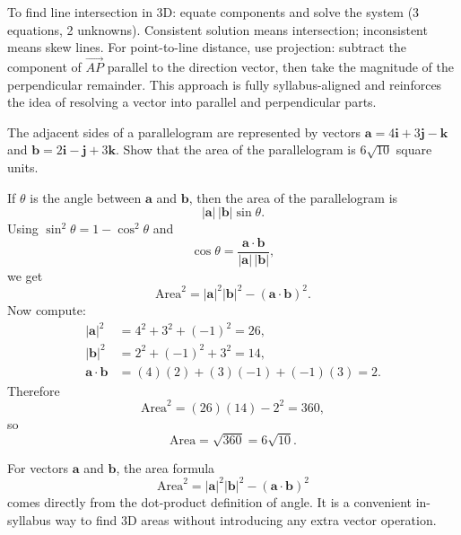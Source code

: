 \begin{takeaways}
To find line intersection in 3D: equate components and solve the system (3 equations, 2 unknowns). Consistent solution means intersection; inconsistent means skew lines. For point-to-line distance, use projection: subtract the component of $\vec{AP}$ parallel to the direction vector, then take the magnitude of the perpendicular remainder. This approach is fully syllabus-aligned and reinforces the idea of resolving a vector into parallel and perpendicular parts.
\end{takeaways}

\vspace{1em}

\begin{problem}
The adjacent sides of a parallelogram are represented by vectors 
$\mathbf{a} = 4\mathbf{i} + 3\mathbf{j} - \mathbf{k}$ and $\mathbf{b} = 2\mathbf{i} - \mathbf{j} + 3\mathbf{k}$.
Show that the area of the parallelogram is $6\sqrt{10}$ square units.
\end{problem}

\begin{solution}
If $\theta$ is the angle between $\mathbf{a}$ and $\mathbf{b}$, then the area of the parallelogram is
\[
|\mathbf{a}|\,|\mathbf{b}|\sin\theta.
\]
Using $\sin^2\theta = 1 - \cos^2\theta$ and
\[
\cos\theta = \frac{\mathbf{a} \cdot \mathbf{b}}{|\mathbf{a}|\,|\mathbf{b}|},
\]
we get
\[
\text{Area}^2 = |\mathbf{a}|^2 |\mathbf{b}|^2 - (\mathbf{a} \cdot \mathbf{b})^2.
\]
Now compute:
\begin{align*}
|\mathbf{a}|^2 &= 4^2 + 3^2 + (-1)^2 = 26,\\
|\mathbf{b}|^2 &= 2^2 + (-1)^2 + 3^2 = 14,\\
\mathbf{a} \cdot \mathbf{b} &= (4)(2) + (3)(-1) + (-1)(3) = 2.
\end{align*}
Therefore
\[
\text{Area}^2 = (26)(14) - 2^2 = 360,
\]
so
\[
\text{Area} = \sqrt{360} = 6\sqrt{10}.
\]
\end{solution}

\begin{takeaways}
For vectors $\mathbf{a}$ and $\mathbf{b}$, the area formula
\[
\text{Area}^2 = |\mathbf{a}|^2 |\mathbf{b}|^2 - (\mathbf{a} \cdot \mathbf{b})^2
\]
comes directly from the dot-product definition of angle. It is a convenient in-syllabus way to find 3D areas without introducing any extra vector operation.
\end{takeaways}

\vspace{1em}


